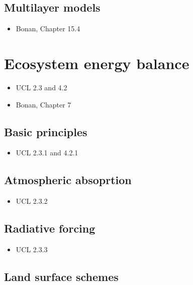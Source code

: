 \documentclass[oneside]{book}
\providecommand{\tightlist}{%
  \setlength{\itemsep}{0pt}\setlength{\parskip}{0pt}}
\begin{document}
\subsection{Multilayer models}\label{multilayer-models}

\begin{itemize}
\tightlist
\item
  Bonan, Chapter 15.4
\end{itemize}

\section{Ecosystem energy balance}\label{ecosystem-energy-balance}

\begin{itemize}
\tightlist
\item
  UCL 2.3 and 4.2
\item
  Bonan, Chapter 7
\end{itemize}

\subsection{Basic principles}\label{basic-principles}

\begin{itemize}
\tightlist
\item
  UCL 2.3.1 and 4.2.1
\end{itemize}

\subsection{Atmospheric absoprtion}\label{atmospheric-absoprtion}

\begin{itemize}
\tightlist
\item
  UCL 2.3.2
\end{itemize}

\subsection{Radiative forcing}\label{radiative-forcing}

\begin{itemize}
\tightlist
\item
  UCL 2.3.3
\end{itemize}

\subsection{Land surface schemes}\label{land-surface-schemes}
\end{document}
